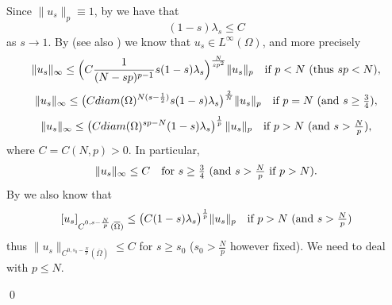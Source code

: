 \documentclass[11pt, reqno]{amsart}
\theoremstyle{definition}
\numberwithin{equation}{section}
\newcommand{\diam}{{\rm diam}}
\def\norm#1{\|#1\|}
\renewenvironment{proof}[1][\proofname]{\medskip \noindent {\bfseries #1. }}{\qed \bigskip}
\begin{document}
\begin{proof}
Since $\norm{u_s}_p \equiv 1$, by \cite[Theorem 1.2]{BPS16} we have that 
$$(1-s) \lambda_s \leq C$$ 
as $s \to 1$. 
By \cite[Theorem 2.10]{BPS16} (see also \cite[Corollary 4.2]{IMS14}) we know that $u_s \in L^{\infty}(\Omega)$, and more precisely
$$\norm{u_s}_{\infty} \leq \Big(C \frac{1}{(N-sp)^{p-1}} s (1-s) \lambda_s\Big)^{\frac{N}{s p^2}} \norm{u_s}_p \quad \hbox{if $p<N$ (thus $sp<N$)},$$
$$\norm{u_s}_{\infty} \leq \big(C \diam(\Omega)^{N(s-\frac{1}{2})} s (1-s) \lambda_s\big)^{\frac{2}{N}} \norm{u_s}_p \quad \hbox{if $p=N$ (and $s\geq \frac{3}{4}$)},$$
$$\norm{u_s}_{\infty} \leq \left(C \diam(\Omega)^{sp - N} (1-s) \lambda_s\right)^{\frac{1}{p}} \norm{u_s}_p \quad \hbox{if $p>N$ (and $s > \frac{N}{p}$)},$$
where $C=C(N,p)>0$. 
In particular, 
\begin{equation}\label{eq_uniform_linf_frac}
\norm{u_s}_{\infty} \leq C \quad \hbox{for $s \geq \frac{3}{4}$ (and $s>\frac{N}{p}$ if $p>N$)}.
\end{equation}
By \cite[(2.27) in proof of Theorem 2.10]{BPS16} we also know that 
$$[u_s]_{C^{0,s-\frac{N}{p}}(\overline{\Omega})} \leq \big(C (1-s) \lambda_s\big)^{\frac{1}{p}} \norm{u_s}_p\quad \hbox{if $p>N$ (and $s > \frac{N}{p}$)}$$
thus $\norm{u_s}_{C^{0,s_0-\frac{N}{p}}(\overline{\Omega})} \leq C$ for $s \geq s_0$ ($s_0>\frac{N}{p}$ however fixed).
We need to deal with $p \leq N$.



\end{proof}
\end{document}
